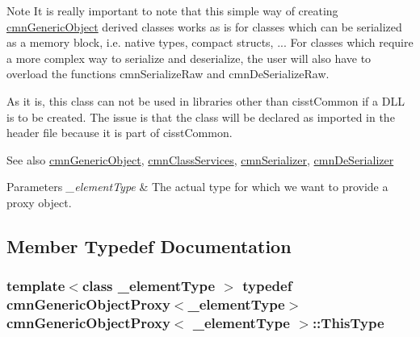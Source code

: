 \begin{DoxyNote}{Note}
It is really important to note that this simple way of creating \hyperlink{classcmn_generic_object}{cmn\+Generic\+Object} derived classes works as is for classes which can be serialized as a memory block, i.\+e. native types, compact structs, ... For classes which require a more complex way to serialize and deserialize, the user will also have to overload the functions cmn\+Serialize\+Raw and cmn\+De\+Serialize\+Raw.

As it is, this class can not be used in libraries other than cisst\+Common if a D\+L\+L is to be created. The issue is that the class will be declared as imported in the header file because it is part of cisst\+Common.
\end{DoxyNote}
\begin{DoxySeeAlso}{See also}
\hyperlink{classcmn_generic_object}{cmn\+Generic\+Object}, \hyperlink{classcmn_class_services}{cmn\+Class\+Services}, \hyperlink{classcmn_serializer}{cmn\+Serializer}, \hyperlink{classcmn_de_serializer}{cmn\+De\+Serializer}
\end{DoxySeeAlso}

\begin{DoxyParams}{Parameters}
{\em \+\_\+element\+Type} & The actual type for which we want to provide a proxy object. \\
\hline
\end{DoxyParams}


\subsection{Member Typedef Documentation}
\hypertarget{classcmn_generic_object_proxy_a4ad0391ca48ebfb86d6bbda89a98c99d}{}
\subsubsection[{This\+Type}]{\setlength{\rightskip}{0pt plus 5cm}template$<$class \+\_\+element\+Type $>$ typedef {\bf cmn\+Generic\+Object\+Proxy}$<$\+\_\+element\+Type$>$ {\bf cmn\+Generic\+Object\+Proxy}$<$ \+\_\+element\+Type $>$\+::{\bf This\+Type}}\label{classcmn_generic_object_proxy_a4ad0391ca48ebfb86d6bbda89a98c99d}
\hypertarget{classcmn_generic_object_proxy_a5a3db96e5acd73055d5d34c25c1635f3}{}
